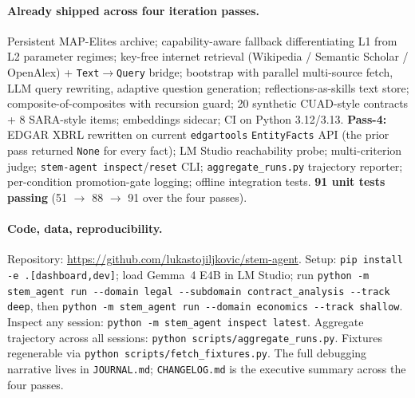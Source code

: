 \documentclass[11pt,a4paper]{article}
\begin{document}
\paragraph{Already shipped across four iteration passes.} Persistent MAP-Elites archive; capability-aware fallback differentiating L1 from L2 parameter regimes; key-free internet retrieval (Wikipedia / Semantic Scholar / OpenAlex) + \texttt{Text}$\to$\texttt{Query} bridge; bootstrap with parallel multi-source fetch, LLM query rewriting, adaptive question generation; reflections-as-skills text store; composite-of-composites with recursion guard; 20 synthetic CUAD-style contracts + 8 SARA-style items; embeddings sidecar; CI on Python 3.12/3.13. \textbf{Pass-4:} EDGAR XBRL rewritten on current \texttt{edgartools} \texttt{EntityFacts} API (the prior pass returned \texttt{None} for every fact); LM Studio reachability probe; multi-criterion judge; \texttt{stem-agent inspect}/\texttt{reset} CLI; \texttt{aggregate\_runs.py} trajectory reporter; per-condition promotion-gate logging; offline integration tests. \textbf{91 unit tests passing} (51 $\to$ 88 $\to$ 91 over the four passes).

\paragraph{Code, data, reproducibility.} Repository: \url{https://github.com/lukastojiljkovic/stem-agent}. Setup: \texttt{pip install -e .[dashboard,dev]}; load Gemma~4 E4B in LM Studio; run \texttt{python -m stem\_agent run -{}-domain legal -{}-subdomain contract\_analysis -{}-track deep}, then \texttt{python -m stem\_agent run -{}-domain economics -{}-track shallow}. Inspect any session: \texttt{python -m stem\_agent inspect latest}. Aggregate trajectory across all sessions: \texttt{python scripts/aggregate\_runs.py}. Fixtures regenerable via \texttt{python scripts/fetch\_fixtures.py}. The full debugging narrative lives in \texttt{JOURNAL.md}; \texttt{CHANGELOG.md} is the executive summary across the four passes.

{\small


}
\end{document}
